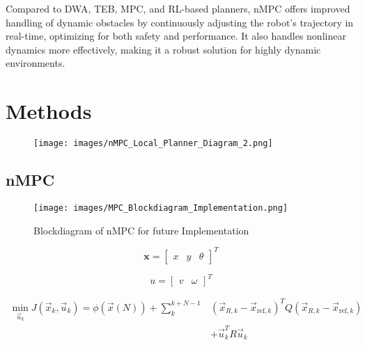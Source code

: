 \documentclass[conference]{IEEEtran}
\begin{document}
Compared to DWA, TEB, MPC, and RL-based planners, nMPC offers improved handling of dynamic obstacles by continuously adjusting the robot's trajectory in real-time, optimizing for both safety and performance. It also handles nonlinear dynamics more effectively, making it a robust solution for highly dynamic environments.

\section{Methods}

\begin{figure}[!h]
    \centering
    \texttt{[image: images/nMPC\_Local\_Planner\_Diagram\_2.png]}
    \caption{ }
    \label{fig:nMPC_Local_Planner_Diagram_2}
\end{figure}


\subsection{nMPC}

\begin{figure}[!h]
    \centering
    \texttt{[image: images/MPC\_Blockdiagram\_Implementation.png]}
    \caption{Blockdiagram of nMPC for future Implementation }
    \label{fig:MPC_Blockdiagram_Implementation}
\end{figure}

\begin{equation}\label{eq:state_vector}
    \mathbf{x} = \begin{bmatrix} x & y & \theta \end{bmatrix}^T
\end{equation}

\begin{equation}\label{eq:control_vector}
    u = \begin{bmatrix}
    v & \omega
\end{bmatrix}^T
\end{equation}


\begin{equation}
\label{eq:L_function}
\begin{aligned}
\min_{\vec{u}_k} J(\vec{x}_k, \vec{u}_k) = \phi(\vec{x}(N)) + \sum_{k}^{k+N-1} &
(\vec{x}_{R,k} - \vec{x}_{\text{ref},k})^T Q (\vec{x}_{R,k} - \vec{x}_{\text{ref},k}) \\
&+ \vec{u}_k^T R \vec{u}_k
\end{aligned}
\end{equation}
\end{document}

